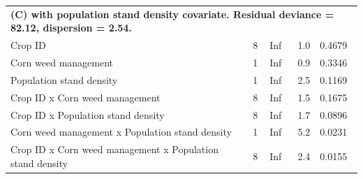 \documentclass[
]{article}
\begin{document}
\begin{landscape}
\begin{table}
{\begin{tabular}[t]{lllrl}
\multicolumn{5}{l}{\textbf{(C) with population stand density covariate. Residual deviance = 82.12, dispersion = 2.54.}}\\
\hspace{1em}Crop ID & 8 & Inf & 1.0 & 0.4679\\
\hspace{1em}Corn weed management & 1 & Inf & 0.9 & 0.3346\\
\hspace{1em}Population stand density & 1 & Inf & 2.5 & 0.1169\\
\hspace{1em}Crop ID x Corn weed management & 8 & Inf & 1.5 & 0.1675\\
\hspace{1em}Crop ID x Population stand density & 8 & Inf & 1.7 & 0.0896\\
\hspace{1em}Corn weed management x Population stand density & 1 & Inf & 5.2 & 0.0231\\
\hspace{1em}Crop ID x Corn weed management x Population stand density & 8 & Inf & 2.4 & 0.0155\\
\bottomrule
\end{tabular}}
\end{table}
\end{landscape}
\end{document}
